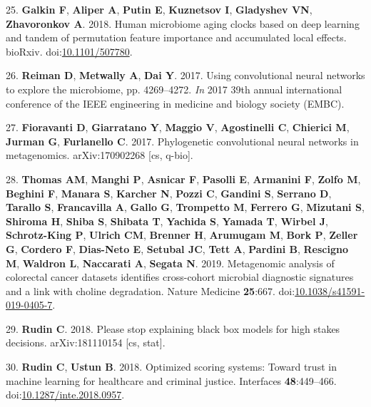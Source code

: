 \documentclass[11pt,]{article}
\begin{document}
\hypertarget{ref-galkin_human_2018}{}
25. \textbf{Galkin F}, \textbf{Aliper A}, \textbf{Putin E},
\textbf{Kuznetsov I}, \textbf{Gladyshev VN}, \textbf{Zhavoronkov A}.
2018. Human microbiome aging clocks based on deep learning and tandem of
permutation feature importance and accumulated local effects. bioRxiv.
doi:\href{https://doi.org/10.1101/507780}{10.1101/507780}.

\hypertarget{ref-reiman_using_2017}{}
26. \textbf{Reiman D}, \textbf{Metwally A}, \textbf{Dai Y}. 2017. Using
convolutional neural networks to explore the microbiome, pp. 4269--4272.
\emph{In} 2017 39th annual international conference of the IEEE
engineering in medicine and biology society (EMBC).

\hypertarget{ref-fioravanti_phylogenetic_2017}{}
27. \textbf{Fioravanti D}, \textbf{Giarratano Y}, \textbf{Maggio V},
\textbf{Agostinelli C}, \textbf{Chierici M}, \textbf{Jurman G},
\textbf{Furlanello C}. 2017. Phylogenetic convolutional neural networks
in metagenomics. arXiv:170902268 {[}cs, q-bio{]}.

\hypertarget{ref-thomas_metagenomic_2019}{}
28. \textbf{Thomas AM}, \textbf{Manghi P}, \textbf{Asnicar F},
\textbf{Pasolli E}, \textbf{Armanini F}, \textbf{Zolfo M},
\textbf{Beghini F}, \textbf{Manara S}, \textbf{Karcher N}, \textbf{Pozzi
C}, \textbf{Gandini S}, \textbf{Serrano D}, \textbf{Tarallo S},
\textbf{Francavilla A}, \textbf{Gallo G}, \textbf{Trompetto M},
\textbf{Ferrero G}, \textbf{Mizutani S}, \textbf{Shiroma H},
\textbf{Shiba S}, \textbf{Shibata T}, \textbf{Yachida S}, \textbf{Yamada
T}, \textbf{Wirbel J}, \textbf{Schrotz-King P}, \textbf{Ulrich CM},
\textbf{Brenner H}, \textbf{Arumugam M}, \textbf{Bork P}, \textbf{Zeller
G}, \textbf{Cordero F}, \textbf{Dias-Neto E}, \textbf{Setubal JC},
\textbf{Tett A}, \textbf{Pardini B}, \textbf{Rescigno M},
\textbf{Waldron L}, \textbf{Naccarati A}, \textbf{Segata N}. 2019.
Metagenomic analysis of colorectal cancer datasets identifies
cross-cohort microbial diagnostic signatures and a link with choline
degradation. Nature Medicine \textbf{25}:667.
doi:\href{https://doi.org/10.1038/s41591-019-0405-7}{10.1038/s41591-019-0405-7}.

\hypertarget{ref-rudin_please_2018}{}
29. \textbf{Rudin C}. 2018. Please stop explaining black box models for
high stakes decisions. arXiv:181110154 {[}cs, stat{]}.

\hypertarget{ref-rudin_optimized_2018}{}
30. \textbf{Rudin C}, \textbf{Ustun B}. 2018. Optimized scoring systems:
Toward trust in machine learning for healthcare and criminal justice.
Interfaces \textbf{48}:449--466.
doi:\href{https://doi.org/10.1287/inte.2018.0957}{10.1287/inte.2018.0957}.
\end{document}
